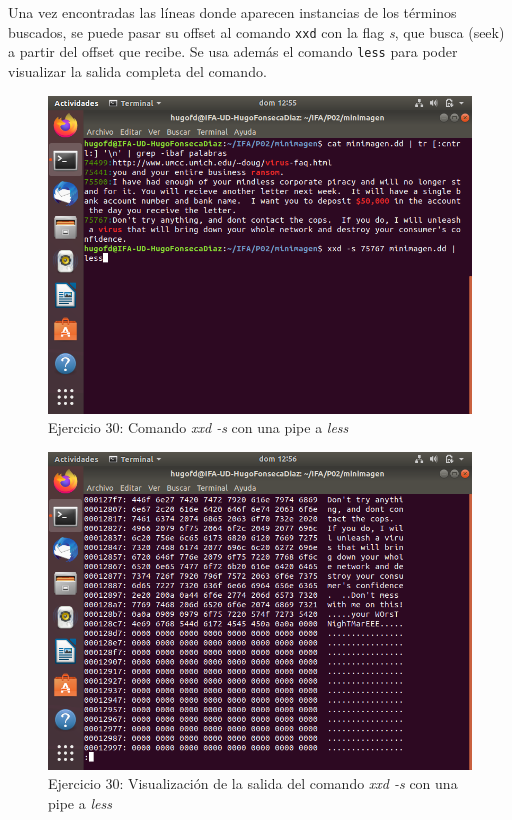 \documentclass[11pt]{article}
\begin{document}
Una vez encontradas las líneas donde aparecen instancias de los términos buscados, se puede pasar su offset al comando \verb|xxd| con la flag \textit{s}, que busca (seek) a partir del offset que recibe. Se usa además el comando \verb|less| para poder visualizar la salida completa del comando.

\begin{figure}[H]
    \caption{Ejercicio 30: Comando \textit{xxd -s} con una pipe a \textit{less}}
  \centering
  \includegraphics[scale=0.7]{e30-2.png}
\end{figure}

\begin{figure}[H]
    \caption{Ejercicio 30: Visualización de la salida del comando \textit{xxd -s} con una pipe a \textit{less}}
  \centering
  \includegraphics[scale=0.7]{e30-3.png}
\end{figure}
\end{document}
